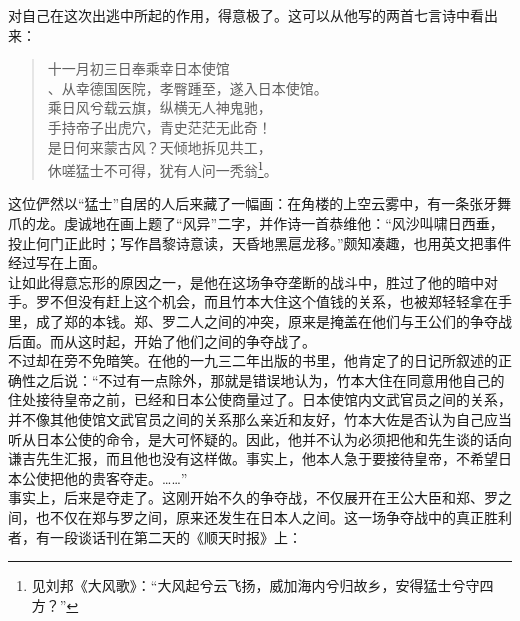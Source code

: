 对自己在这次出逃中所起的作用，得意极了。这可以从他写的两首七言诗中看出来：\\

\begin{quote}
	十一月初三日奉乘幸日本使馆\\

、从幸德国医院，孝臀踵至，遂入日本使馆。\\

乘日风兮载云旗，纵横无人神鬼驰，\\

手持帝子出虎穴，青史茫茫无此奇！\\

是日何来蒙古风？天倾地拆见共工，\\

休嗟猛士不可得，犹有人问一秃翁\footnote{见刘邦《大风歌》：“大风起兮云飞扬，威加海内兮归故乡，安得猛士兮守四方？”}。\\
\end{quote}

这位俨然以“猛士”自居的人后来藏了一幅画：在角楼的上空云雾中，有一条张牙舞爪的龙。虔诚地在画上题了“风异”二字，并作诗一首恭维他：“风沙叫啸日西垂，投止何门正此时；写作昌黎诗意读，天昏地黑扈龙移。”颇知凑趣，也用英文把事件经过写在上面。\\

让如此得意忘形的原因之一，是他在这场争夺垄断的战斗中，胜过了他的暗中对手。罗不但没有赶上这个机会，而且竹本大住这个值钱的关系，也被郑轻轻拿在手里，成了郑的本钱。郑、罗二人之间的冲突，原来是掩盖在他们与王公们的争夺战后面。而从这时起，开始了他们之间的争夺战了。\\

不过却在旁不免暗笑。在他的一九三二年出版的书里，他肯定了的日记所叙述的正确性之后说：“不过有一点除外，那就是错误地认为，竹本大住在同意用他自己的住处接待皇帝之前，已经和日本公使商量过了。日本使馆内文武官员之间的关系，并不像其他使馆文武官员之间的关系那么亲近和友好，竹本大佐是否认为自己应当听从日本公使的命令，是大可怀疑的。因此，他并不认为必须把他和先生谈的话向谦吉先生汇报，而且他也没有这样做。事实上，他本人急于要接待皇帝，不希望日本公使把他的贵客夺走。……”\\

事实上，后来是夺走了。这刚开始不久的争夺战，不仅展开在王公大臣和郑、罗之间，也不仅在郑与罗之间，原来还发生在日本人之间。这一场争夺战中的真正胜利者，有一段谈话刊在第二天的《顺天时报》上：\\


